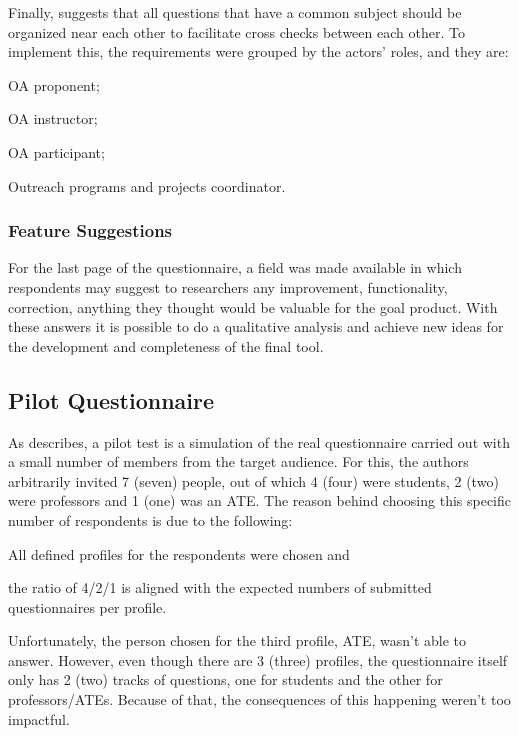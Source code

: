 Finally,  suggests that all questions that have a common subject should be organized near each other to facilitate cross checks between each other. To implement this, the requirements were grouped by the actors' roles, and they are:
\begin{inparaenum}[(1)]
  \item \ac{OA} proponent;
  \item \ac{OA} instructor;
  \item \ac{OA} participant;
  \item Outreach programs and projects coordinator.
\end{inparaenum}

\subsubsection{Feature Suggestions}

For the last page of the questionnaire, a field was made available in which respondents may suggest to researchers any improvement, functionality, correction, anything they thought would be valuable for the goal product. With these answers it is possible to do a qualitative analysis and achieve new ideas for the development and completeness of the final tool.

\subsection{Pilot Questionnaire}\label{sec:survey-pilot}

As  describes, a pilot test is a simulation of the real questionnaire carried out with a small number of members from the target audience. For this, the authors arbitrarily invited 7 (seven) people, out of which 4 (four) were students, 2 (two) were professors and 1 (one) was an \ac{ATE}. The reason behind choosing this specific number of respondents is due to the following:
\begin{inparaenum}[(i)]
  \item All defined profiles for the respondents were chosen and
  \item the ratio of 4/2/1 is aligned with the expected numbers of submitted questionnaires per profile.
\end{inparaenum}

Unfortunately, the person chosen for the third profile, \ac{ATE}, wasn't able to answer. However, even though there are 3 (three) profiles, the questionnaire itself only has 2 (two) tracks of questions, one for students and the other for professors/\acp{ATE}. Because of that, the consequences of this happening weren't too impactful.

